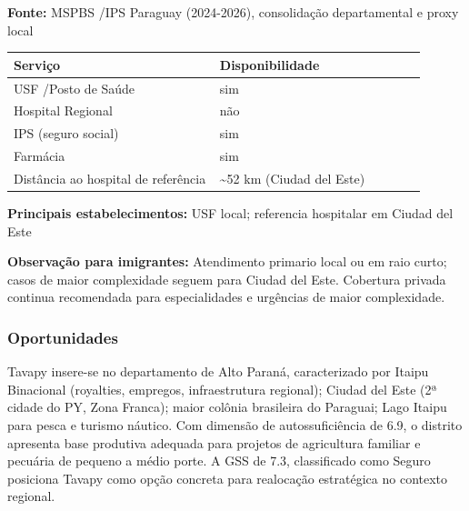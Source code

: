 \textbf{Fonte:} MSPBS /\allowbreak  IPS Paraguay (2024-2026), consolidação
departamental e proxy local

{\def\LTcaptype{none} %
\begin{longtable}{@{}>{\raggedright\arraybackslash}p{0.45\linewidth} >{\raggedright\arraybackslash}p{0.45\linewidth}@{}}
\toprule\noalign{}
Serviço & Disponibilidade \\
\midrule\noalign{}
\endhead
\bottomrule\noalign{}
\endlastfoot
USF /\allowbreak  Posto de Saúde & sim \\
Hospital Regional & não \\
IPS (seguro social) & sim \\
Farmácia & sim \\
Distância ao hospital de referência & \textasciitilde52 km (Ciudad del
Este) \\
\end{longtable}
}

\textbf{Principais estabelecimentos:} USF local; referencia hospitalar
em Ciudad del Este

\textbf{Observação para imigrantes:} Atendimento primario local ou em
raio curto; casos de maior complexidade seguem para Ciudad del Este.
Cobertura privada continua recomendada para especialidades e urgências
de maior complexidade.
\newpage

\subsubsection*{Oportunidades}\label{oport-tavapy-1021}
Tavapy insere-se no departamento de Alto Paraná, caracterizado por Itaipu Binacional (royalties, empregos, infraestrutura regional); Ciudad del Este (2ª cidade do PY, Zona Franca); maior colônia brasileira do Paraguai; Lago Itaipu para pesca e turismo náutico. Com dimensão de autossuficiência de 6.9, o distrito apresenta base produtiva adequada para projetos de agricultura familiar e pecuária de pequeno a médio porte. A GSS de 7.3, classificado como Seguro posiciona Tavapy como opção concreta para realocação estratégica no contexto regional.

